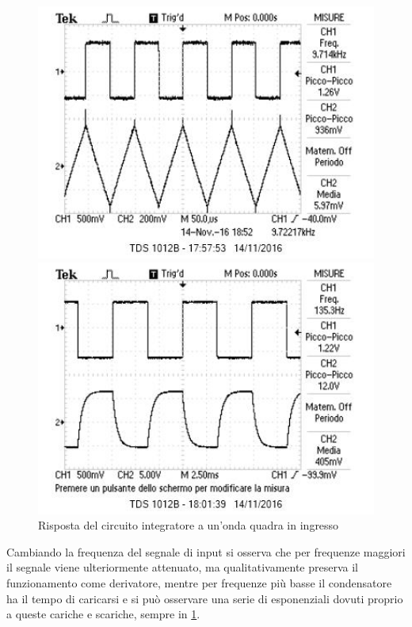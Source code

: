 \documentclass[10pt,a4paper]{article}
\begin{document}
\begin{figure}[h!]
	\begin{minipage}[t]{0.45\textwidth}
		\centering
		\includegraphics[width=1\textwidth]{../oscilloscopio/sqint.jpg}
	\end{minipage}
	\begin{minipage}[t]{0.45\textwidth}
		\centering
		\includegraphics[width=1\textwidth]{../oscilloscopio/sqexp.jpg}
	\end{minipage}
	\caption{Risposta del circuito integratore a un'onda quadra in ingresso}
	\label{fig:intsq}
\end{figure}

Cambiando la frequenza del segnale di input si osserva che per frequenze maggiori il segnale viene ulteriormente attenuato, ma qualitativamente preserva il funzionamento come derivatore, mentre per frequenze più basse il condensatore ha il tempo di caricarsi e si può osservare una serie di esponenziali dovuti proprio a queste cariche e scariche, sempre in \figurename{\ref{fig:intsq}}.
\end{document}
